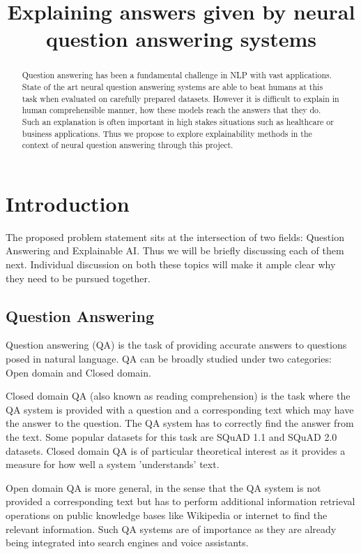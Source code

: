 \documentclass[10pt,twocolumn,letterpaper]{article}
\begin{document}
\title{Explaining answers given by neural question answering systems}


\maketitle

\begin{abstract}
Question answering has been a fundamental challenge in NLP with vast applications. State of the art neural question answering systems are able to beat humans at this task when evaluated on carefully prepared datasets. However it is difficult to explain in human comprehensible manner, how these models reach the answers that they do. Such an explanation is often important in high stakes situations such as healthcare or business applications. Thus we propose to explore explainability methods in the context of neural question answering through this project.
\end{abstract}

\section{Introduction}
\label{sec:intro}
The proposed problem statement sits at the intersection of two fields: Question Answering and Explainable AI. Thus we will be briefly discussing each of them next. Individual discussion on both these topics will make it ample clear why they need to be pursued together.

\subsection{Question Answering}
\label{QAintro}
Question answering (QA) is the task of providing accurate answers to questions posed in natural language. QA can be broadly studied under two categories: Open domain and Closed domain.

Closed domain QA (also known as reading comprehension) is the task where the QA system is provided with a question and a corresponding text which may have the answer to the question. The QA system has to correctly find the answer from the text. Some popular datasets for this task are SQuAD 1.1 and SQuAD 2.0 datasets. Closed domain QA is of particular theoretical interest as it provides a measure for how well a system 'understands' text.

Open domain QA is more general, in the sense that the QA system is not provided a corresponding text but has to perform additional information retrieval operations on public knowledge bases like Wikipedia or internet to find the relevant information. Such QA systems are of importance as they are already being integrated into search engines and voice assistants.
\end{document}
